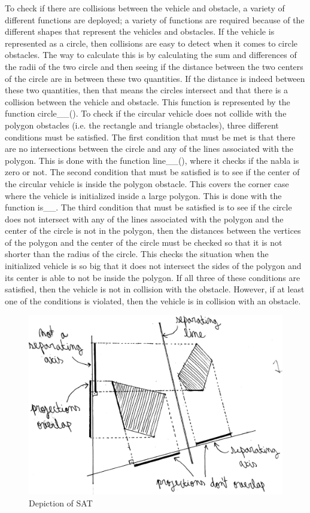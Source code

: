 \documentclass[10pt,letterpaper]{article}
\begin{document}
\noindent To check if there are collisions between the vehicle and obstacle, a variety of different functions are deployed; a variety of functions are required because of the different shapes that represent the vehicles and obstacles. If the vehicle is represented as a circle, then collisions are easy to detect when it comes to circle obstacles. The way to calculate this is by calculating the sum and differences of the radii of the two circle and then seeing if the distance between the two centers of the circle are in between these two quantities. If the distance is indeed between these two quantities, then that means the circles intersect and that there is a collision between the vehicle and obstacle. This function is represented by the function circle\_\circle\_\collision(). To check if the circular vehicle does not collide with the polygon obstacles (i.e. the rectangle and triangle obstacles), three different conditions must be satisfied. The first condition that must be met is that there are no intersections between the circle and any of the lines associated with the polygon. This is done with the function line\_\circle\_\intersect(), where it checks if the nabla is zero or not. The second condition that must be satisfied is to see if the center of the circular vehicle is inside the polygon obstacle. This covers the corner case where the vehicle is initialized inside a large polygon. This is done with the function is\_\inside\_\circle. The third condition that must be satisfied is to see if the circle does not intersect with any of the lines associated with the polygon and the center of the circle is not in the polygon, then the distances between the vertices of the polygon and the center of the circle must be checked so that it is not shorter than the radius of the circle. This checks the situation when the initialized vehicle is so big that it does not intersect the sides of the polygon and its center is able to not be inside the polygon. If all three of these conditions are satisfied, then the vehicle is not in collision with the obstacle. However, if at least one of the conditions is violated, then the vehicle is in collision with an obstacle.\\ 

\begin{figure}[!h]
    \centering
    \includegraphics[width= 11 cm]{figures/SAT.png}
    \caption{Depiction of SAT}
    \label{fig: sat}
\end{figure}
\end{document}
